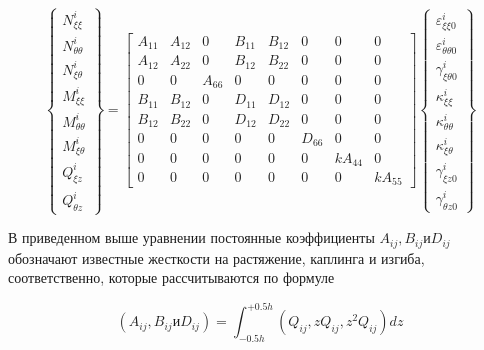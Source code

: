 \begin{equation}
	\label{eq:vibro1:12}
	\begin{Bmatrix}
		N_{\xi \xi}^{i}\\
		N_{\theta \theta}^{i} \\
		N_{\xi \theta}^{i} \\
		M_{\xi \xi}^{i} \\
		M_{\theta \theta}^{i}\\
		M_{\xi \theta}^{i}\\
		Q_{\xi z}^{i}\\
		Q_{\theta z}^{i}	
	\end{Bmatrix} =
\begin{bmatrix}
	A_{11} & A_{12} & 0 & B_{11} & B_{12} & 0 & 0 & 0 \\
	A_{12} & A_{22} & 0 & B_{12} & B_{22} & 0 & 0 & 0 \\
	0 & 0 & A_{66} & 0 & 0 & 0 & 0 & 0 \\
	B_{11} & B_{12} & 0 & D_{11} & D_{12} & 0 & 0 & 0 \\
	B_{12} & B_{22} & 0 & D_{12} & D_{22} & 0 & 0 & 0 \\
	0 & 0 & 0 & 0 & 0 & D_{66} & 0 & 0 \\
	0 & 0 & 0 & 0 & 0 & 0 & k A_{44} & 0 \\
	0 & 0 & 0 & 0 & 0 & 0 & 0 & k A_{55}
\end{bmatrix}
	\begin{Bmatrix}
		\varepsilon_{\xi \xi 0}^{i}\\
		\varepsilon_{\theta \theta 0}^{i} \\
		\gamma_{\xi \theta 0}^{i} \\
		\kappa_{\xi \xi }^{i} \\
		\kappa_{\theta \theta}^{i}\\
		\kappa_{\xi \theta}^{i}\\
		\gamma_{\xi z 0}^{i}\\
		\gamma_{\theta z 0}^{i}
	\end{Bmatrix}
\end{equation}

В приведенном выше уравнении постоянные коэффициенты \(A_{i j} , B_{i j} и D_{i j}\) обозначают известные жесткости на растяжение, каплинга и изгиба, соответственно, которые рассчитываются по формуле

\begin{equation}
	\label{eq:vibro1:13}
	\left ( A_{i j} , B_{i j} и D_{i j} \right ) = \int_{-0.5 h}^{+0.5h} \left ( Q_{i j} , zQ_{i j} , z^2 Q_{i j} \right ) dz
\end{equation}

